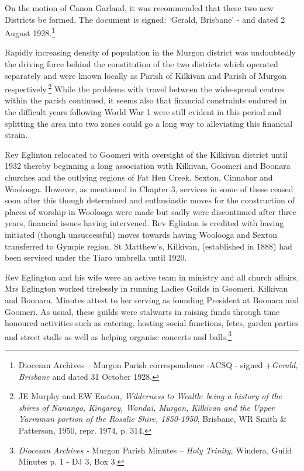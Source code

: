 On the motion of Canon Garland, it was recommended that these two new
Districts be formed. The document is signed: `Gerald, Brisbane' - and
dated 2 August 1928.\footnote{Diocesan Archives -- Murgon Parish
  correspondence -ACSQ - signed +\emph{Gerald, Brisbane} and dated 31
  October 1928.}

Rapidly increasing density of population in the Murgon district was
undoubtedly the driving force behind the constitution of the two
districts which operated separately and were known locally as Parish of
Kilkivan and Parish of Murgon respectively.\footnote{JE Murphy and EW
  Easton, \emph{Wilderness to Wealth: being a history of the shires of
  Nanango, Kingaroy, Wondai, Murgon, Kilkivan and the Upper Yarraman
  portion of the Rosalie Shire, 1850-1950}, Brisbane, WR Smith \&
  Patterson, 1950, repr. 1974, p. 314.} While the problems with travel
between the wide-spread centres within the parish continued, it seems
also that financial constraints endured in the difficult years following
World War 1 were still evident in this period and splitting the area
into two zones could go a long way to alleviating this financial strain.

Rev Eglinton relocated to Goomeri with oversight of the Kilkivan
district until 1932 thereby beginning a long association with Kilkivan,
Goomeri and Boonara churches and the outlying regions of Fat Hen Creek.
Sexton, Cinnabar and Woolooga. However, as mentioned in Chapter 3,
services in some of these ceased soon after this though determined and
enthusiastic moves for the construction of places of worship in Woolooga
were made but sadly were discontinued after three years, financial
issues having intervened. Rev Eglinton is credited with having initiated
(though unsuccessful) moves towards having Woolooga and Sexton
transferred to Gympie region. St Matthew's, Kilkivan, (established in
1888) had been serviced under the Tiaro umbrella until 1920.

Rev Eglington and his wife were an active team in ministry and all
church affairs. Mrs Eglington worked tirelessly in running Ladies Guilds
in Goomeri, Kilkivan and Boonara. Minutes attest to her serving as
founding President at Boonara and Goomeri. As usual, these guilds were
stalwarts in raising funds through time honoured activities such as
catering, hosting social functions, fetes, garden parties and street
stalls as well as helping organise concerts and balls.\footnote{\emph{Diocesan
  Archives -} Murgon Parish Minutes -- \emph{Holy Trinity,}
  Windera\emph{,} Guild Minutes p. 1 - DJ 3, Box 3.}

